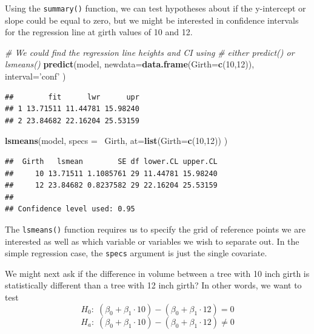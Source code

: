 \documentclass[]{book}
\newenvironment{Shaded}{\begin{snugshade}}{\end{snugshade}}
\newcommand{\KeywordTok}[1]{\textcolor[rgb]{0.13,0.29,0.53}{\textbf{{#1}}}}
\newcommand{\DataTypeTok}[1]{\textcolor[rgb]{0.13,0.29,0.53}{{#1}}}
\newcommand{\DecValTok}[1]{\textcolor[rgb]{0.00,0.00,0.81}{{#1}}}
\newcommand{\StringTok}[1]{\textcolor[rgb]{0.31,0.60,0.02}{{#1}}}
\newcommand{\CommentTok}[1]{\textcolor[rgb]{0.56,0.35,0.01}{\textit{{#1}}}}
\newcommand{\NormalTok}[1]{{#1}}
\theoremstyle{definition}
\theoremstyle{definition}
\theoremstyle{remark}
\begin{document}
Using the \texttt{summary()} function, we can test hypotheses about if
the y-intercept or slope could be equal to zero, but we might be
interested in confidence intervals for the regression line at girth
values of 10 and 12.

\begin{Shaded}
\begin{Highlighting}[]
\CommentTok{# We could find the regression line heights and CI using }
\CommentTok{# either predict() or lsmeans()}
\KeywordTok{predict}\NormalTok{(model, }\DataTypeTok{newdata=}\KeywordTok{data.frame}\NormalTok{(}\DataTypeTok{Girth=}\KeywordTok{c}\NormalTok{(}\DecValTok{10}\NormalTok{,}\DecValTok{12}\NormalTok{)), }\DataTypeTok{interval=}\StringTok{'conf'} \NormalTok{)}
\end{Highlighting}
\end{Shaded}

\begin{verbatim}
##        fit      lwr      upr
## 1 13.71511 11.44781 15.98240
## 2 23.84682 22.16204 25.53159
\end{verbatim}

\begin{Shaded}
\begin{Highlighting}[]
\KeywordTok{lsmeans}\NormalTok{(model, }\DataTypeTok{specs =} \NormalTok{~Girth, }\DataTypeTok{at=}\KeywordTok{list}\NormalTok{(}\DataTypeTok{Girth=}\KeywordTok{c}\NormalTok{(}\DecValTok{10}\NormalTok{,}\DecValTok{12}\NormalTok{)) )  }
\end{Highlighting}
\end{Shaded}

\begin{verbatim}
##  Girth   lsmean        SE df lower.CL upper.CL
##     10 13.71511 1.1085761 29 11.44781 15.98240
##     12 23.84682 0.8237582 29 22.16204 25.53159
## 
## Confidence level used: 0.95
\end{verbatim}

The \texttt{lsmeans()} function requires us to specify the grid of
reference points we are interested as well as which variable or
variables we wish to separate out. In the simple regression case, the
\texttt{specs} argument is just the single covariate.

We might next ask if the difference in volume between a tree with 10
inch girth is statistically different than a tree with 12 inch girth? In
other words, we want to test
\[ H_0:\; (\beta_0 + \beta_1\cdot10 ) - (\beta_0 + \beta_1 \cdot 12) = 0\]
\[ H_a:\; (\beta_0 + \beta_1\cdot10 ) - (\beta_0 + \beta_1 \cdot 12) \ne 0\]
\end{document}
